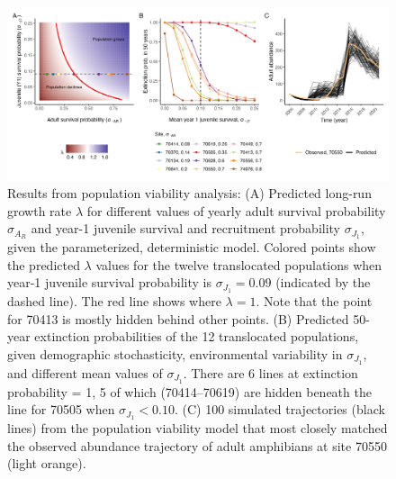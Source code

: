 \documentclass[
  letterpaper,
  DIV=11,
  numbers=noendperiod]{scrartcl}
\begin{document}
\begin{figure}

{\centering \includegraphics[width=6.77083in,height=\textheight]{figures/pop_viability_figures_for_manuscript.jpg}

}

\caption{\label{fig-viability}Results from population viability
analysis: (A) Predicted long-run growth rate \(\lambda\) for different
values of yearly adult survival probability \(\sigma_{A_R}\) and year-1
juvenile survival and recruitment probability \(\sigma_{J_1}\), given
the parameterized, deterministic model. Colored points show the
predicted \(\lambda\) values for the twelve translocated populations
when year-1 juvenile survival probability is \(\sigma_{J_1} = 0.09\)
(indicated by the dashed line). The red line shows where
\(\lambda = 1\). Note that the point for 70413 is mostly hidden behind
other points. (B) Predicted 50-year extinction probabilities of the 12
translocated populations, given demographic stochasticity, environmental
variability in \(\sigma_{J_1}\), and different mean values of
\(\sigma_{J_1}\). There are 6 lines at extinction probability = 1, 5 of
which (70414--70619) are hidden beneath the line for 70505 when
\(\sigma_{J_1} < 0.10\). (C) 100 simulated trajectories (black lines)
from the population viability model that most closely matched the
observed abundance trajectory of adult amphibians at site 70550 (light
orange).}

\end{figure}

\newpage
\end{document}
